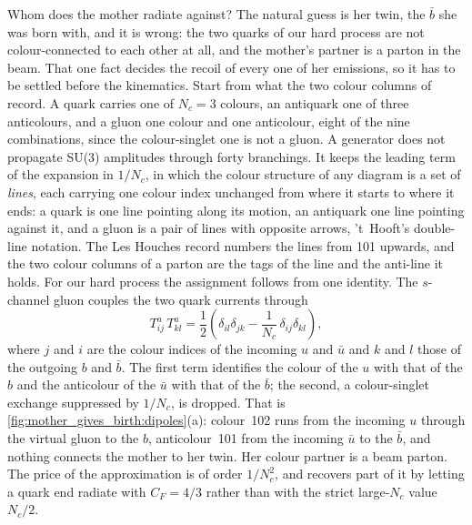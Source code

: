 Whom does the mother radiate against? The natural guess is her twin, the
$\bar b$ she was born with, and it is wrong: the two quarks of our hard
process are not colour-connected to each other at all, and the mother's
partner is a parton in the beam. That one fact decides the recoil of every
one of her emissions, so it has to be settled before the kinematics.
Start from what the two colour columns of  record. A
quark carries one of $N_c=3$ colours, an antiquark one of three
anticolours, and a gluon one colour and one anticolour, eight of the nine
combinations, since the colour-singlet one is not a gluon. A generator does
not propagate SU(3) amplitudes through forty branchings. It keeps the
leading term of the expansion in $1/N_c$, in which the colour structure of
any diagram is a set of \emph{lines}, each carrying one colour index
unchanged from where it starts to where it ends: a quark is one line
pointing along its motion, an antiquark one line pointing against it, and
a gluon is a pair of lines with opposite arrows, 't~Hooft's double-line
notation. The Les Houches record numbers the lines from 101 upwards, and
the two colour columns of a parton are the tags of the line and the
anti-line it holds. For our hard process the assignment follows from one
identity. The $s$-channel gluon couples the two quark currents through
\begin{equation}
  T^a_{ij}\,T^a_{kl}
  =\frac12\left(\delta_{il}\delta_{jk}-\frac{1}{N_c}\,\delta_{ij}\delta_{kl}\right),
  \label{eq:mother_gives_birth:fierz}
\end{equation}
where $j$ and $i$ are the colour indices of the incoming $u$ and $\bar u$
and $k$ and $l$ those of the outgoing $b$ and $\bar b$. The first term
identifies the colour of the $u$ with that of the $b$ and the anticolour
of the $\bar u$ with that of the $\bar b$; the second, a colour-singlet
exchange suppressed by $1/N_c$, is dropped. That is
\cref{fig:mother_gives_birth:dipoles}(a): colour~102 runs from the
incoming $u$ through the virtual gluon to the $b$, anticolour~101 from the
incoming $\bar u$ to the $\bar b$, and nothing connects the mother to her
twin. Her colour partner is a beam parton. The price of the approximation
is of order $1/N_c^2$, and \PYTHIA recovers part of it by letting a quark
end radiate with $C_F=4/3$ rather than with the strict large-$N_c$ value
$N_c/2$.


